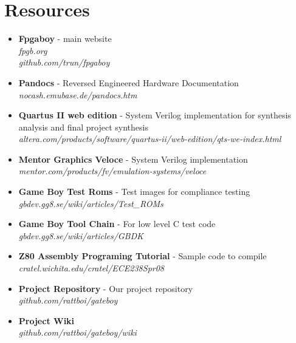 \section{Resources}
\begin{itemize}
    \item {\bf Fpgaboy}
            - main website\\
            {\it fpgb.org} \\
            {\it github.com/trun/fpgaboy}
    \item {\bf Pandocs} - Reversed Engineered Hardware Documentation\\ 
            {\it nocash.emubase.de/pandocs.htm}
    \item {\bf Quartus II web edition} - System Verilog implementation 
             for synthesis analysis and final project synthesis\\
            {\it altera.com/products/software/quartus-ii/web-edition/qts-we-index.html}
    \item {\bf Mentor Graphics Veloce} - System Verilog implementation\\
            {\it mentor.com/products/fv/emulation-systems/veloce}
    \item {\bf Game Boy Test Roms}     - Test images for compliance testing\\
            {\it gbdev.gg8.se/wiki/articles/Test\_ROMs}
    \item {\bf Game Boy Tool Chain} - For low level C test code \\
            {\it gbdev.gg8.se/wiki/articles/GBDK}
    \item {\bf Z80 Assembly Programing Tutorial} - Sample code to compile\\
            {\it cratel.wichita.edu/cratel/ECE238Spr08}
    \item {\bf Project Repository} - Our project repository\\
            {\it github.com/rattboi/gateboy}
    \item {\bf Project Wiki}\\
            {\it github.com/rattboi/gateboy/wiki}
\end{itemize}

